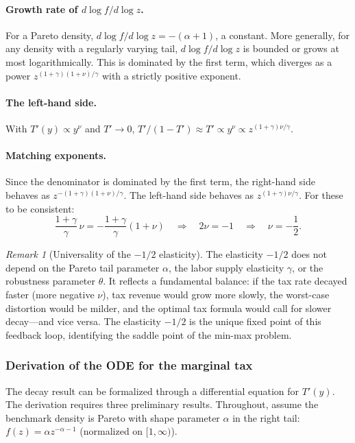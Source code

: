 \documentclass[12pt,a4paper]{article}
\theoremstyle{definition}
\theoremstyle{plain}
\theoremstyle{remark}
\newtheorem{remark}{Remark}[section]
\begin{document}
\paragraph{Growth rate of $d\log f/d\log z$.}
For a Pareto density, $d\log f/d\log z = -(\alpha+1)$, a constant. More generally, for any density with a regularly varying tail, $d\log f/d\log z$ is bounded or grows at most logarithmically. This is dominated by the first term, which diverges as a power $z^{(1+\gamma)(1+\nu)/\gamma}$ with a strictly positive exponent.

\paragraph{The left-hand side.}
With $T'(y) \propto y^\nu$ and $T' \to 0$, $T'/(1-T') \approx T' \propto y^\nu \propto z^{(1+\gamma)\nu/\gamma}$.

\paragraph{Matching exponents.}
Since the denominator is dominated by the first term, the right-hand side behaves as $z^{-(1+\gamma)(1+\nu)/\gamma}$. The left-hand side behaves as $z^{(1+\gamma)\nu/\gamma}$. For these to be consistent:
\[
  \frac{1+\gamma}{\gamma}\, \nu = -\frac{1+\gamma}{\gamma}(1+\nu)
  \quad \Longrightarrow \quad 2\nu = -1
  \quad \Longrightarrow \quad \nu = -\frac{1}{2}.
\]

\begin{remark}[Universality of the $-1/2$ elasticity]
\label{rem:universal_half}
The elasticity $-1/2$ does not depend on the Pareto tail parameter $\alpha$, the labor supply elasticity $\gamma$, or the robustness parameter $\theta$. It reflects a fundamental balance: if the tax rate decayed faster (more negative $\nu$), tax revenue would grow more slowly, the worst-case distortion would be milder, and the optimal tax formula would call for slower decay---and vice versa. The elasticity $-1/2$ is the unique fixed point of this feedback loop, identifying the saddle point of the min-max problem.
\end{remark}

\subsubsection{Derivation of the ODE for the marginal tax}

The decay result can be formalized through a differential equation for $T'(y)$. The derivation requires three preliminary results. Throughout, assume the benchmark density is Pareto with shape parameter $\alpha$ in the right tail: $f(z) = \alpha z^{-\alpha-1}$ (normalized on $[1,\infty)$).
\end{document}
